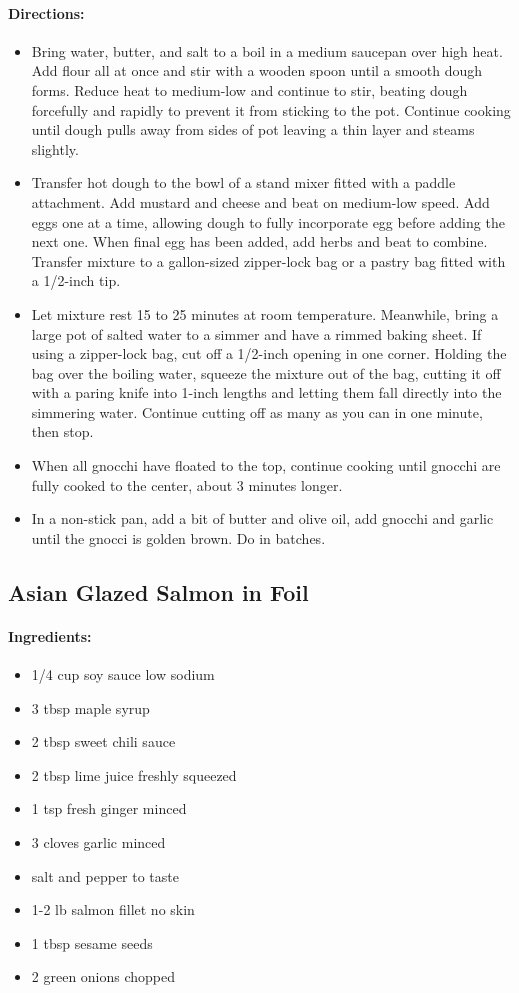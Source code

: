 \documentclass{article}
\begin{document}
\paragraph{Directions:}
\begin{itemize}
	\item Bring water, butter, and salt to a boil in a medium saucepan over high heat. Add flour all at once and stir with a wooden spoon until a smooth dough forms. Reduce heat to medium-low and continue to stir, beating dough forcefully and rapidly to prevent it from sticking to the pot. Continue cooking until dough pulls away from sides of pot leaving a thin layer and steams slightly.
	\item Transfer hot dough to the bowl of a stand mixer fitted with a paddle attachment. Add mustard and cheese and beat on medium-low speed. Add eggs one at a time, allowing dough to fully incorporate egg before adding the next one. When final egg has been added, add herbs and beat to combine. Transfer mixture to a gallon-sized zipper-lock bag or a pastry bag fitted with a 1/2-inch tip.
	\item Let mixture rest 15 to 25 minutes at room temperature. Meanwhile, bring a large pot of salted water to a simmer and have a rimmed baking sheet. If using a zipper-lock bag, cut off a 1/2-inch opening in one corner. Holding the bag over the boiling water, squeeze the mixture out of the bag, cutting it off with a paring knife into 1-inch lengths and letting them fall directly into the simmering water. Continue cutting off as many as you can in one minute, then stop.
	\item When all gnocchi have floated to the top, continue cooking until gnocchi are fully cooked to the center, about 3 minutes longer. 
	\item In a non-stick pan, add a bit of butter and olive oil, add gnocchi and garlic until the gnocci is golden brown. Do in batches.
\end{itemize}

\subsection{Asian Glazed Salmon in Foil}

\paragraph{Ingredients:}
\begin{itemize}
  \item 1/4 cup soy sauce low sodium
  \item 3 tbsp maple syrup
  \item 2 tbsp sweet chili sauce
  \item 2 tbsp lime juice freshly squeezed
  \item 1 tsp fresh ginger minced
  \item 3 cloves garlic minced
  \item salt and pepper to taste
  \item 1-2 lb salmon fillet no skin
  \item 1 tbsp sesame seeds
  \item 2 green onions chopped
\end{itemize}
\end{document}
